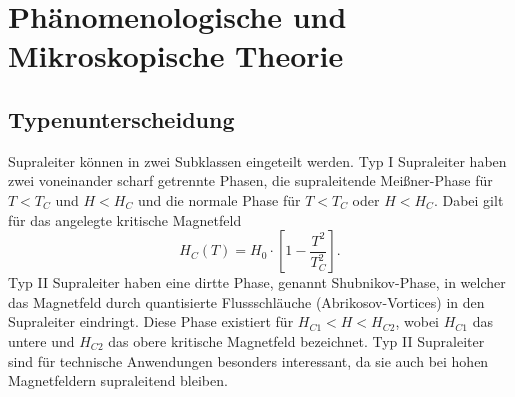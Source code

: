 
\section{Phänomenologische und Mikroskopische Theorie}

\subsection{Typenunterscheidung}
Supraleiter können in zwei Subklassen eingeteilt werden.
Typ I Supraleiter haben zwei voneinander scharf getrennte Phasen, die supraleitende Meißner-Phase für $T< T_C$ und $H<H_C$ und die normale Phase für $T< T_C$ oder $H<H_C$. Dabei gilt für das angelegte kritische Magnetfeld
\begin{equation}
    H_C(T) = H_0 \cdot \left[1 - \frac{T^2}{T_C^2}\right].
\end{equation}
Typ II Supraleiter haben eine dirtte Phase, genannt Shubnikov-Phase, in welcher das Magnetfeld durch quantisierte Flussschläuche (Abrikosov-Vortices) in den Supraleiter eindringt. Diese Phase existiert für $H_{C1} < H < H_{C2}$, wobei $H_{C1}$ das untere und $H_{C2}$ das obere kritische Magnetfeld bezeichnet. Typ II Supraleiter sind für technische Anwendungen besonders interessant, da sie auch bei hohen Magnetfeldern supraleitend bleiben.
